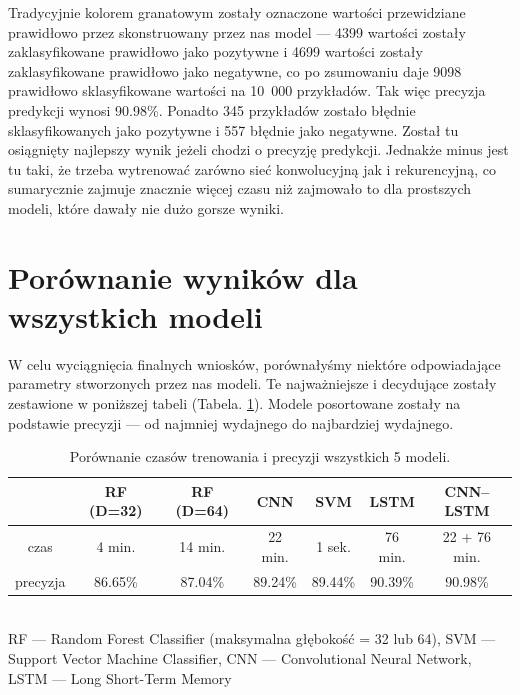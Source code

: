 \noindent Tradycyjnie kolorem granatowym zostały oznaczone wartości przewidziane prawidłowo przez skonstruowany przez nas model --- 4399 wartości zostały zaklasyfikowane prawidłowo jako pozytywne i 4699 wartości zostały zaklasyfikowane prawidłowo jako negatywne, co po zsumowaniu daje 9098 prawidłowo sklasyfikowane wartości na 10~000 przykładów. Tak więc precyzja predykcji wynosi 90.98\%. Ponadto 345 przykładów zostało błędnie sklasyfikowanych jako pozytywne i 557 błędnie jako negatywne. Został tu osiągnięty najlepszy wynik jeżeli chodzi o precyzję predykcji. Jednakże minus jest tu taki, że trzeba wytrenować zarówno sieć konwolucyjną jak i rekurencyjną, co sumarycznie zajmuje znacznie więcej czasu niż zajmowało to dla prostszych modeli, które dawały nie dużo gorsze wyniki. 

\section{Porównanie wyników dla wszystkich modeli}
W celu wyciągnięcia finalnych wniosków, porównałyśmy niektóre odpowiadające parametry stworzonych przez nas modeli. Te najważniejsze i decydujące zostały zestawione w poniższej tabeli (Tabela. \ref{tab:porównanie}). Modele posortowane zostały na podstawie precyzji --- od najmniej wydajnego do najbardziej wydajnego. 

\begin{table} [H]
	\caption{Porównanie czasów trenowania i precyzji wszystkich 5 modeli.}
	\label{tab:porównanie}
	\begin{center}
		\begin{tabular}{c | c c c c c c}
			\hline
			&  RF (D=32)      &  RF (D=64)  &       CNN         &     SVM         &    LSTM        &    CNN--LSTM \\
			\hline
			czas         &  4 min.       &   14 min.         &      22 min.     &     1 sek.        &    76 min.     &   22 + 76 min. \\
			precyzja  &  86.65\%       &    87.04\%     &    89.24\%     &     89.44\%    &   90.39\%     &     90.98\% \\
			\hline
		\end{tabular}  \\
		{\scriptsize 	RF --- Random Forest Classifier (maksymalna głębokość = 32 lub 64), SVM --- Support Vector Machine Classifier, CNN --- Convolutional Neural Network, LSTM --- Long Short-Term Memory\\}
	\end{center}
\end{table}

